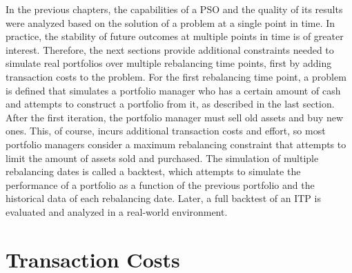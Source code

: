 \documentclass[
  oneside]{book}
\begin{document}
In the previous chapters, the capabilities of a PSO and the quality of its results were analyzed based on the solution of a problem at a single point in time. In practice, the stability of future outcomes at multiple points in time is of greater interest. Therefore, the next sections provide additional constraints needed to simulate real portfolios over multiple rebalancing time points, first by adding transaction costs to the problem. For the first rebalancing time point, a problem is defined that simulates a portfolio manager who has a certain amount of cash and attempts to construct a portfolio from it, as described in the last section. After the first iteration, the portfolio manager must sell old assets and buy new ones. This, of course, incurs additional transaction costs and effort, so most portfolio managers consider a maximum rebalancing constraint that attempts to limit the amount of assets sold and purchased. The simulation of multiple rebalancing dates is called a backtest, which attempts to simulate the performance of a portfolio as a function of the previous portfolio and the historical data of each rebalancing date. Later, a full backtest of an ITP is evaluated and analyzed in a real-world environment.

\hypertarget{transaction-costs}{%
\section{Transaction Costs}\label{transaction-costs}}
\end{document}

